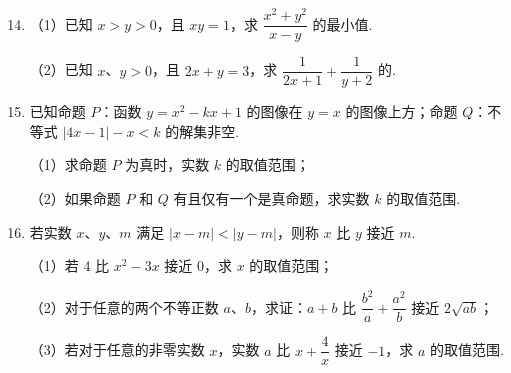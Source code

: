\documentclass[a4paper,11pt]{article}
\begin{document}
\begin{enumerate}
\setcounter{enumi}{13}

\item （1）已知 $x>y>0$，且 $xy=1$，求 $\dfrac{x^2+y^2}{x-y}$ 的最小值.

（2）已知 $x$、$y>0$，且 $2x+y=3$，求 $\dfrac1{2x+1}+\dfrac1{y+2}$ 的.

\ifanswer
\solbegin
{}
\solend
\fi

\ansspace[6]

\item 已知命题 $P$：函数 $y=x^2-kx+1$ 的图像在 $y=x$ 的图像上方；命题 $Q$：不等式 $|4x-1|-x<k$ 的解集非空.

（1）求命题 $P$ 为真时，实数 $k$ 的取值范围；

（2）如果命题 $P$ 和 $Q$ 有且仅有一个是真命题，求实数 $k$ 的取值范围.

\ifanswer
\ans{（1）$(-3,1)$；（2）$\left(-3,-\dfrac14\right]\cup[1,+\infty)$}
\fi

\ansspace[8]

\item 若实数 $x$、$y$、$m$ 满足 $|x-m|<|y-m|$，则称 $x$ 比 $y$ 接近 $m$.

（1）若 4 比 $x^2-3x$ 接近 0，求 $x$ 的取值范围；

（2）对于任意的两个不等正数 $a$、$b$，求证：$a+b$ 比 $\dfrac{b^2}a+\dfrac{a^2}b$ 接近 $2\sqrt{ab}$；

（3）若对于任意的非零实数 $x$，实数 $a$ 比 $x+\dfrac4x$ 接近 $-1$，求 $a$ 的取值范围.


\end{enumerate}
\end{document}
